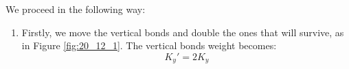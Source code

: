 \documentclass[../../Main/Main.tex]{subfiles}
\begin{document}
We proceed in the following way:
\begin{enumerate}
\item Firstly, we move the vertical bonds and double the ones that will survive, as in Figure \ref{fig:20_12_1}. The vertical bonds weight becomes:
\begin{equation*}
  K_y' = 2 K_y
\end{equation*}


\begin{figure}[H]
\begin{minipage}[c]{0.5\linewidth}
\end{minipage}
\begin{minipage}[]{0.5\linewidth}
\centering
{}
\end{minipage}
\caption{\label{fig:20_12} }
\end{figure}


\end{enumerate}
\end{document}
